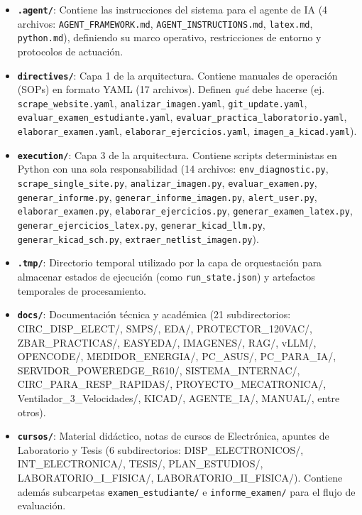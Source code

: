 \documentclass[12pt,a4paper]{article}
\begin{document}
\begin{itemize}
    \item \textbf{\texttt{.agent/}}: Contiene las instrucciones del sistema para el agente de IA (4 archivos: \texttt{AGENT\_FRAMEWORK.md}, \texttt{AGENT\_INSTRUCTIONS.md}, \texttt{latex.md}, \texttt{python.md}), definiendo su marco operativo, restricciones de entorno y protocolos de actuación.
    \item \textbf{\texttt{directives/}}: Capa 1 de la arquitectura. Contiene manuales de operación (SOPs) en formato YAML (17 archivos). Definen \textit{qué} debe hacerse (ej. \texttt{scrape\_website.yaml}, \texttt{analizar\_imagen.yaml}, \texttt{git\_update.yaml}, \texttt{evaluar\_examen\_estudiante.yaml}, \texttt{evaluar\_practica\_laboratorio.yaml}, \texttt{elaborar\_examen.yaml}, \texttt{elaborar\_ejercicios.yaml}, \texttt{imagen\_a\_kicad.yaml}).
    \item \textbf{\texttt{execution/}}: Capa 3 de la arquitectura. Contiene scripts deterministas en Python con una sola responsabilidad (14 archivos: \texttt{env\_diagnostic.py}, \texttt{scrape\_single\_site.py}, \texttt{analizar\_imagen.py}, \texttt{evaluar\_examen.py}, \texttt{generar\_informe.py}, \texttt{generar\_informe\_imagen.py}, \texttt{alert\_user.py}, \texttt{elaborar\_examen.py}, \texttt{elaborar\_ejercicios.py}, \texttt{generar\_examen\_latex.py}, \texttt{generar\_ejercicios\_latex.py}, \texttt{generar\_kicad\_llm.py}, \texttt{generar\_kicad\_sch.py}, \texttt{extraer\_netlist\_imagen.py}).
    \item \textbf{\texttt{.tmp/}}: Directorio temporal utilizado por la capa de orquestación para almacenar estados de ejecución (como \texttt{run\_state.json}) y artefactos temporales de procesamiento.
    \item \textbf{\texttt{docs/}}: Documentación técnica y académica (21 subdirectorios: CIRC\_DISP\_ELECT/, SMPS/, EDA/, PROTECTOR\_120VAC/, ZBAR\_PRACTICAS/, EASYEDA/, IMAGENES/, RAG/, vLLM/, OPENCODE/, MEDIDOR\_ENERGIA/, PC\_ASUS/, PC\_PARA\_IA/, SERVIDOR\_POWEREDGE\_R610/, SISTEMA\_INTERNAC/, CIRC\_PARA\_RESP\_RAPIDAS/, PROYECTO\_MECATRONICA/, Ventilador\_3\_Velocidades/, KICAD/, AGENTE\_IA/, MANUAL/, entre otros).
    \item \textbf{\texttt{cursos/}}: Material didáctico, notas de cursos de Electrónica, apuntes de Laboratorio y Tesis (6 subdirectorios: DISP\_ELECTRONICOS/, INT\_ELECTRONICA/, TESIS/, PLAN\_ESTUDIOS/, LABORATORIO\_I\_FISICA/, LABORATORIO\_II\_FISICA/). Contiene además subcarpetas \texttt{examen\_estudiante/} e \texttt{informe\_examen/} para el flujo de evaluación.

\end{itemize}
\end{document}
